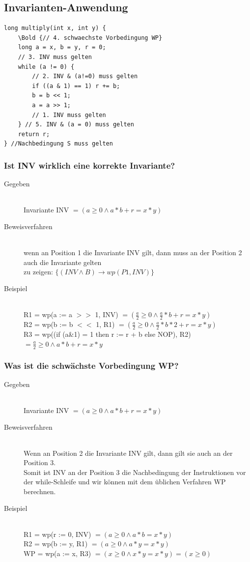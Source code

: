 \documentclass[a4paper,10pt]{article}
\newcommand{\Bold}[1]{\textbf{#1}} %
\newcommand{\ra}{\rightarrow}
\begin{document}
\subsection{Invarianten-Anwendung}
\begin{lstlisting}
long multiply(int x, int y) {
	\Bold {// 4. schwaechste Vorbedingung WP}
	long a = x, b = y, r = 0;
	// 3. INV muss gelten
	while (a != 0) {
		// 2. INV & (a!=0) muss gelten
		if ((a & 1) == 1) r += b;
		b = b << 1;
		a = a >> 1;
		// 1. INV muss gelten
	} // 5. INV & (a = 0) muss gelten
	return r;
} //Nachbedingung S muss gelten
\end{lstlisting}
\subsubsection{Ist INV wirklich eine korrekte Invariante?}
\begin{description}
	\item[Gegeben] \hfill \\
		Invariante INV $= (a \geq 0 \wedge a*b + r = x*y)$ 
	\item[Beweisverfahren] \hfill \\
		wenn an Position 1 die Invariante INV gilt, dann muss an der Position 2 auch die Invariante gelten \\
		zu zeigen: $\{ (INV \wedge B) \ra wp(P1, INV) \}$
	\item[Beispiel] \hfill \\
		R1 = wp(a := a $>>$ 1, INV) $= (\frac{a}{2} \geq 0 \wedge \frac{a}{2}*b + r = x*y)$ \\
		R2 = wp(b := b $<<$ 1, R1) $= (\frac{a}{2} \geq 0 \wedge \frac{a}{2}*b*2 + r = x*y)$ \\
		R3 = wp((if (a\&1) = 1 then r := r + b else NOP), R2) $= \frac{a}{2} \geq 0 \wedge a*b + r = x*y$
\end{description}

\subsubsection{Was ist die schw\"achste Vorbedingung WP?}
\begin{description}
	\item[Gegeben] \hfill \\
		Invariante INV $= (a \geq 0 \wedge a*b + r = x*y)$ 
	\item[Beweisverfahren] \hfill \\
		Wenn an Position 2 die Invariante INV gilt, dann gilt sie auch an der Position 3. \\
		Somit ist INV an der Position 3 die Nachbedingung der Instruktionen vor der while-Schleife und wir k\"onnen mit dem \"ublichen Verfahren WP berechnen.
	\item[Beispiel] \hfill \\
		R1 = wp(r := 0, INV) $= (a \geq 0 \wedge a*b = x*y)$ \\
		R2 = wp(b := y, R1) $= (a \geq 0 \wedge a*y = x*y)$ \\
		WP = wp(a := x, R3) $= (x \geq 0 \wedge x*y = x*y) = (x \geq 0)$
\end{description}
\end{document}
